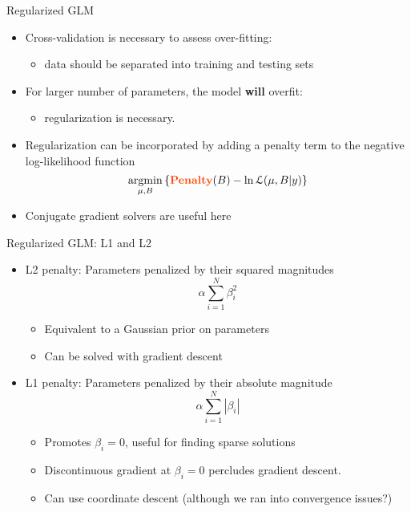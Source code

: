 \documentclass[svgnames,13pt]{beamer}
\DeclareRobustCommand{\emph}[1]{\textbf{{\color{emphasizecolor} #1}}}
\newcommand{\argmin}{\operatornamewithlimits{argmin}}
\begin{document}
\begin{frame}{Regularized GLM }
\begin{itemize}
	\item <1->Cross-validation is necessary to assess over-fitting: 
	\begin{itemize}
		\item data should be separated into training and testing sets
		\end{itemize}
	\item <2->For larger number of parameters, the model \emph{will} overfit:
	\begin{itemize}
		\item regularization is necessary. 
		\end{itemize}
	\item <3->Regularization can be incorporated by adding a penalty term to the negative log-likelihood function \[\argmin_{\mu,B}\left\{ \textrm{\emph{Penalty}}(B) - \ln\mathcal{L}(\mu,B|y) \right\}\]
	\item <4->Conjugate gradient solvers are useful here
\end{itemize}
\end{frame} 

\begin{frame}{Regularized GLM: L1 and L2}
\begin{itemize}
	\item <1->L2 penalty: Parameters penalized by their squared magnitudes\[  \alpha \sum_{i=1}^N \beta_i^2 \]
	\begin{itemize}
		\item <2->Equivalent to a Gaussian prior on parameters
		\item <3->Can be solved with gradient descent
		\end{itemize}
	\item <4->L1 penalty: Parameters penalized by their absolute magnitude\[ \alpha \sum_{i=1}^N |\beta_i| \]
	\begin{itemize}
		\item <5->Promotes $\beta_i=0$, useful for finding sparse solutions
		\item <6->Discontinuous gradient at $\beta_i=0$ percludes gradient descent. 
		\item <7->Can use coordinate descent (although we ran into convergence issues?)
	\end{itemize}
\end{itemize}
\end{frame} 
\end{document}
